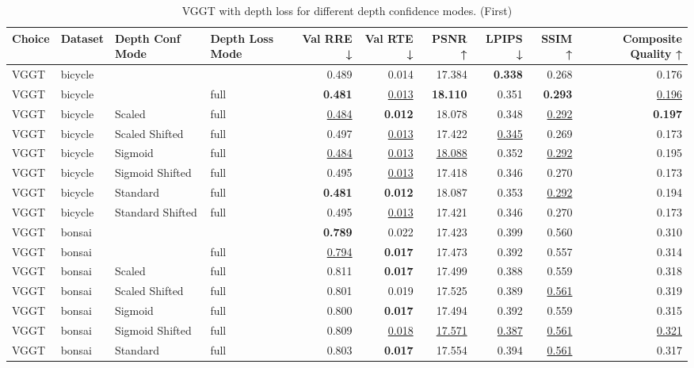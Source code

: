 \begin{table}[H]
\caption{VGGT with depth loss for different depth confidence modes. (First)}
\label{tab:05_depth_conf_mode_first}
\centering
\scriptsize
\begin{tabular}{llllrrrrrr}
\toprule
Choice & Dataset & Depth Conf Mode & Depth Loss Mode & Val RRE ↓ & Val RTE ↓ & PSNR ↑ & LPIPS ↓ & SSIM ↑ & Composite Quality ↑ \\
\midrule
VGGT & bicycle &  &  & 0.489 & 0.014 & 17.384 & \textbf{0.338} & 0.268 & 0.176 \\
VGGT & bicycle &  & full & \textbf{0.481} & \underline{0.013} & \textbf{18.110} & 0.351 & \textbf{0.293} & \underline{0.196} \\
VGGT & bicycle & Scaled & full & \underline{0.484} & \textbf{0.012} & 18.078 & 0.348 & \underline{0.292} & \textbf{0.197} \\
VGGT & bicycle & Scaled Shifted & full & 0.497 & \underline{0.013} & 17.422 & \underline{0.345} & 0.269 & 0.173 \\
VGGT & bicycle & Sigmoid & full & \underline{0.484} & \underline{0.013} & \underline{18.088} & 0.352 & \underline{0.292} & 0.195 \\
VGGT & bicycle & Sigmoid Shifted & full & 0.495 & \underline{0.013} & 17.418 & 0.346 & 0.270 & 0.173 \\
VGGT & bicycle & Standard & full & \textbf{0.481} & \textbf{0.012} & 18.087 & 0.353 & \underline{0.292} & 0.194 \\
VGGT & bicycle & Standard Shifted & full & 0.495 & \underline{0.013} & 17.421 & 0.346 & 0.270 & 0.173 \\
\midrule
VGGT & bonsai &  &  & \textbf{0.789} & 0.022 & 17.423 & 0.399 & 0.560 & 0.310 \\
VGGT & bonsai &  & full & \underline{0.794} & \textbf{0.017} & 17.473 & 0.392 & 0.557 & 0.314 \\
VGGT & bonsai & Scaled & full & 0.811 & \textbf{0.017} & 17.499 & 0.388 & 0.559 & 0.318 \\
VGGT & bonsai & Scaled Shifted & full & 0.801 & 0.019 & 17.525 & 0.389 & \underline{0.561} & 0.319 \\
VGGT & bonsai & Sigmoid & full & 0.800 & \textbf{0.017} & 17.494 & 0.392 & 0.559 & 0.315 \\
VGGT & bonsai & Sigmoid Shifted & full & 0.809 & \underline{0.018} & \underline{17.571} & \underline{0.387} & \underline{0.561} & \underline{0.321} \\
VGGT & bonsai & Standard & full & 0.803 & \textbf{0.017} & 17.554 & 0.394 & \underline{0.561} & 0.317 \\

\end{tabular}
\end{table}

